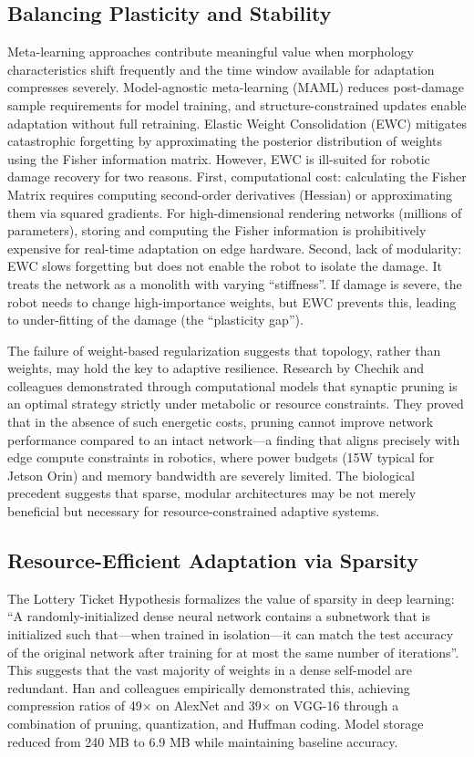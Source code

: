 \documentclass[12pt,a4paper,oneside]{report}
\begin{document}
\subsection{Balancing Plasticity and Stability}

Meta-learning approaches contribute meaningful value when morphology characteristics shift frequently and the time window available for adaptation compresses severely. Model-agnostic meta-learning (MAML) reduces post-damage sample requirements for model training, and structure-constrained updates enable adaptation without full retraining. Elastic Weight Consolidation (EWC) mitigates catastrophic forgetting by approximating the posterior distribution of weights using the Fisher information matrix. However, EWC is ill-suited for robotic damage recovery for two reasons. First, computational cost: calculating the Fisher Matrix requires computing second-order derivatives (Hessian) or approximating them via squared gradients. For high-dimensional rendering networks (millions of parameters), storing and computing the Fisher information is prohibitively expensive for real-time adaptation on edge hardware. Second, lack of modularity: EWC slows forgetting but does not enable the robot to isolate the damage. It treats the network as a monolith with varying ``stiffness''. If damage is severe, the robot needs to change high-importance weights, but EWC prevents this, leading to under-fitting of the damage (the ``plasticity gap'').

The failure of weight-based regularization suggests that topology, rather than weights, may hold the key to adaptive resilience. Research by Chechik and colleagues demonstrated through computational models that synaptic pruning is an optimal strategy strictly under metabolic or resource constraints. They proved that in the absence of such energetic costs, pruning cannot improve network performance compared to an intact network---a finding that aligns precisely with edge compute constraints in robotics, where power budgets (15W typical for Jetson Orin) and memory bandwidth are severely limited. The biological precedent suggests that sparse, modular architectures may be not merely beneficial but necessary for resource-constrained adaptive systems.

\subsection{Resource-Efficient Adaptation via Sparsity}

The Lottery Ticket Hypothesis formalizes the value of sparsity in deep learning: ``A randomly-initialized dense neural network contains a subnetwork that is initialized such that---when trained in isolation---it can match the test accuracy of the original network after training for at most the same number of iterations''. This suggests that the vast majority of weights in a dense self-model are redundant. Han and colleagues empirically demonstrated this, achieving compression ratios of 49$\times$ on AlexNet and 39$\times$ on VGG-16 through a combination of pruning, quantization, and Huffman coding. Model storage reduced from 240 MB to 6.9 MB while maintaining baseline accuracy.
\end{document}
